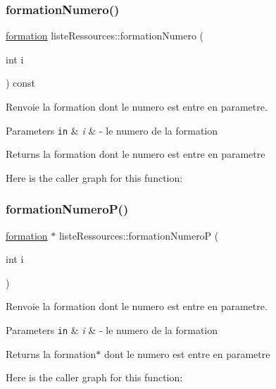 \subsubsection{\texorpdfstring{formation\+Numero()}{formationNumero()}}
{\footnotesize\ttfamily \hyperlink{classformation}{formation} liste\+Ressources\+::formation\+Numero (\begin{DoxyParamCaption}\item[{int}]{i }\end{DoxyParamCaption}) const}



Renvoie la formation dont le numero est entre en parametre. 


\begin{DoxyParams}[1]{Parameters}
\mbox{\tt in}  & {\em i} & -\/ le numero de la formation \\
\hline
\end{DoxyParams}
\begin{DoxyReturn}{Returns}
la formation dont le numero est entre en parametre 
\end{DoxyReturn}
Here is the caller graph for this function\+:
\hypertarget{classliste_ressources_a71ef69325d349c087c995f5aac9b9f27}{}\label{classliste_ressources_a71ef69325d349c087c995f5aac9b9f27} 
\subsubsection{\texorpdfstring{formation\+Numero\+P()}{formationNumeroP()}}
{\footnotesize\ttfamily \hyperlink{classformation}{formation} $\ast$ liste\+Ressources\+::formation\+NumeroP (\begin{DoxyParamCaption}\item[{int}]{i }\end{DoxyParamCaption})}



Renvoie la formation dont le numero est entre en parametre. 


\begin{DoxyParams}[1]{Parameters}
\mbox{\tt in}  & {\em i} & -\/ le numero de la formation \\
\hline
\end{DoxyParams}
\begin{DoxyReturn}{Returns}
la formation$\ast$ dont le numero est entre en parametre 
\end{DoxyReturn}
Here is the caller graph for this function\+:
\hypertarget{classliste_ressources_a332aca734617587a463197043a058b02}{}\label{classliste_ressources_a332aca734617587a463197043a058b02} 
